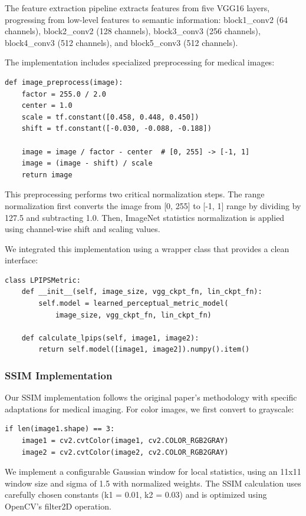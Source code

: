 \documentclass[a4paper,12pt]{article}
\begin{document}
The feature extraction pipeline extracts features from five VGG16 layers, progressing from low-level features to semantic information: block1\_conv2 (64 channels), block2\_conv2 (128 channels), block3\_conv3 (256 channels), block4\_conv3 (512 channels), and block5\_conv3 (512 channels).

The implementation includes specialized preprocessing for medical images:

\begin{verbatim}
def image_preprocess(image):
    factor = 255.0 / 2.0
    center = 1.0
    scale = tf.constant([0.458, 0.448, 0.450])
    shift = tf.constant([-0.030, -0.088, -0.188])
    
    image = image / factor - center  # [0, 255] -> [-1, 1]
    image = (image - shift) / scale
    return image
\end{verbatim}

This preprocessing performs two critical normalization steps. The range normalization first converts the image from [0, 255] to [-1, 1] range by dividing by 127.5 and subtracting 1.0. Then, ImageNet statistics normalization is applied using channel-wise shift and scaling values.

We integrated this implementation using a wrapper class that provides a clean interface:

\begin{verbatim}
class LPIPSMetric:
    def __init__(self, image_size, vgg_ckpt_fn, lin_ckpt_fn):
        self.model = learned_perceptual_metric_model(
            image_size, vgg_ckpt_fn, lin_ckpt_fn)
    
    def calculate_lpips(self, image1, image2):
        return self.model([image1, image2]).numpy().item()
\end{verbatim}

\subsubsection{SSIM Implementation}
Our SSIM implementation follows the original paper's methodology with specific adaptations for medical imaging. For color images, we first convert to grayscale:

\begin{verbatim}
if len(image1.shape) == 3:
    image1 = cv2.cvtColor(image1, cv2.COLOR_RGB2GRAY)
    image2 = cv2.cvtColor(image2, cv2.COLOR_RGB2GRAY)
\end{verbatim}

We implement a configurable Gaussian window for local statistics, using an 11x11 window size and sigma of 1.5 with normalized weights. The SSIM calculation uses carefully chosen constants (k1 = 0.01, k2 = 0.03) and is optimized using OpenCV's filter2D operation.
\end{document}
